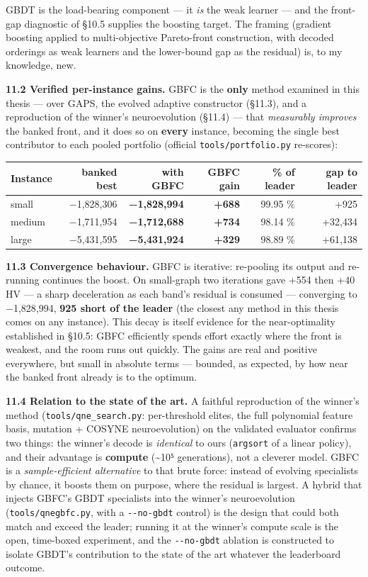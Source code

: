 \documentclass[
  11pt,
]{article}
\begin{document}
GBDT is the load-bearing component --- it \emph{is} the weak learner ---
and the front-gap diagnostic of §10.5 supplies the boosting target. The
framing (gradient boosting applied to multi-objective Pareto-front
construction, with decoded orderings as weak learners and the
lower-bound gap as the residual) is, to my knowledge, new.

\textbf{11.2 Verified per-instance gains.} GBFC is the \textbf{only}
method examined in this thesis --- over GAPS, the evolved adaptive
constructor (§11.3), and a reproduction of the winner's neuroevolution
(§11.4) --- that \emph{measurably improves} the banked front, and it
does so on \textbf{every} instance, becoming the single best contributor
to each pooled portfolio (official \texttt{tools/portfolio.py}
re-scores):

\begin{longtable}[]{@{}lrrrrr@{}}
\toprule
Instance & banked best & with GBFC & GBFC gain & \% of leader & gap to
leader\tabularnewline
\midrule
\endhead
small & −1,828,306 & \textbf{−1,828,994} & \textbf{+688} & 99.95 \% &
+925\tabularnewline
medium & −1,711,954 & \textbf{−1,712,688} & \textbf{+734} & 98.14 \% &
+32,434\tabularnewline
large & −5,431,595 & \textbf{−5,431,924} & \textbf{+329} & 98.89 \% &
+61,138\tabularnewline
\bottomrule
\end{longtable}

\textbf{11.3 Convergence behaviour.} GBFC is iterative: re-pooling its
output and re-running continues the boost. On small-graph two iterations
gave +554 then +40 HV --- a sharp deceleration as each band's residual
is consumed --- converging to −1,828,994, \textbf{925 short of the
leader} (the closest any method in this thesis comes on any instance).
This decay is itself evidence for the near-optimality established in
§10.5: GBFC efficiently spends effort exactly where the front is
weakest, and the room runs out quickly. The gains are real and positive
everywhere, but small in absolute terms --- bounded, as expected, by how
near the banked front already is to the optimum.

\textbf{11.4 Relation to the state of the art.} A faithful reproduction
of the winner's method (\texttt{tools/qne\_search.py}: per-threshold
elites, the full polynomial feature basis, mutation + COSYNE
neuroevolution) on the validated evaluator confirms two things: the
winner's decode is \emph{identical} to ours (\texttt{argsort} of a
linear policy), and their advantage is \textbf{compute}
(\textasciitilde10⁵ generations), not a cleverer model. GBFC is a
\emph{sample-efficient alternative} to that brute force: instead of
evolving specialists by chance, it boosts them on purpose, where the
residual is largest. A hybrid that injects GBFC's GBDT specialists into
the winner's neuroevolution (\texttt{tools/qnegbfc.py}, with a
\texttt{-\/-no-gbdt} control) is the design that could both match and
exceed the leader; running it at the winner's compute scale is the open,
time-boxed experiment, and the \texttt{-\/-no-gbdt} ablation is
constructed to isolate GBDT's contribution to the state of the art
whatever the leaderboard outcome.
\end{document}
